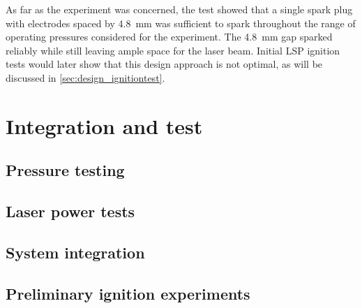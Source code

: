             As far as the experiment was concerned, the test showed that a single spark plug with electrodes spaced by 4.8~mm was sufficient to spark throughout the range of operating pressures considered for the experiment. The 4.8~mm gap sparked reliably while still leaving ample space for the laser beam. Initial LSP ignition tests would later show that this design approach is not optimal, as will be discussed in \autoref{sec:design_ignitiontest}.


    \section{Integration and test}
        \subsection{Pressure testing}
        \subsection{Laser power tests}
        \subsection{System integration}
        \subsection{Preliminary ignition experiments} \label{sec:design_ignitiontest}